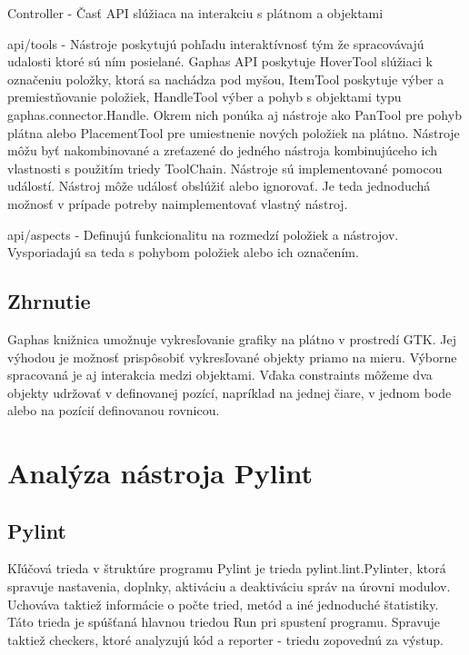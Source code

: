 \documentclass[11pt,oneside,final]{fithesis2}
\begin{document}
\begin{list}{•}{}
\item Controller - Časť API slúžiaca na interakciu s plátnom a objektami
    \begin{list}{•}{}
		\item api/tools - Nástroje poskytujú pohľadu interaktívnosť tým že spracovávajú udalosti ktoré sú ním posielané. Gaphas API poskytuje HoverTool slúžiaci k označeniu položky, ktorá sa nachádza pod myšou, ItemTool poskytuje výber a premiestňovanie položiek, HandleTool výber a pohyb s objektami typu gaphas.connector.Handle. Okrem nich ponúka aj nástroje ako PanTool pre pohyb plátna alebo PlacementTool pre umiestnenie nových položiek na plátno. Nástroje môžu byť nakombinované a zreťazené do jedného nástroja kombinujúceho ich vlastnosti s použitím triedy ToolChain. Nástroje sú implementované pomocou událostí. Nástroj môže událosť obslúžiť alebo ignorovať. Je teda jednoduchá možnosť v prípade potreby naimplementovať vlastný nástroj.
		\item api/aspects - Definujú funkcionalitu na rozmedzí položiek a nástrojov. Vysporiadajú sa teda s pohybom položiek alebo ich označením.
    \end{list}


\end{list}



	\subsection{Zhrnutie}

		Gaphas knižnica umožnuje vykresľovanie grafiky na plátno v prostredí GTK. Jej výhodou je možnosť prispôsobiť vykresľované objekty priamo na mieru. Výborne spracovaná je aj interakcia medzi objektami. Vďaka constraints môžeme dva objekty udržovať v definovanej pozící, napríklad na jednej čiare, v jednom bode alebo na pozícií definovanou rovnicou.
    
    
\section{Analýza nástroja Pylint}

	\subsection{Pylint}
		Kľúčová trieda v štruktúre programu Pylint je trieda pylint.lint.Pylinter, ktorá spravuje nastavenia, doplnky, aktiváciu a deaktiváciu správ na úrovni modulov. Uchováva taktiež informácie o počte tried, metód a iné jednoduché štatistiky. Táto trieda je spúšťaná hlavnou triedou Run pri spustení programu. Spravuje taktiež checkers, ktoré analyzujú kód a reporter - triedu zopovednú za výstup. 
		
\end{document}
